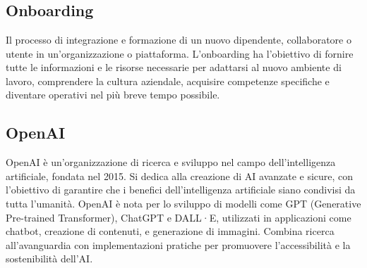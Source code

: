 
\section{}

\hypertarget{sec:onboarding}{}
\subsection*{Onboarding}
Il processo di integrazione e formazione di un nuovo dipendente, collaboratore o utente in un'organizzazione o piattaforma. L'onboarding ha l'obiettivo di 
fornire tutte le informazioni e le risorse necessarie per adattarsi al nuovo ambiente di lavoro, comprendere la cultura aziendale, acquisire competenze 
specifiche e diventare operativi nel più breve tempo possibile. 

\hypertarget{sec:openai}{}
\subsection*{OpenAI}
OpenAI è un'organizzazione di ricerca e sviluppo nel campo dell'intelligenza artificiale, fondata nel 2015. Si dedica alla creazione di AI avanzate e 
sicure, con l'obiettivo di garantire che i benefici dell'intelligenza artificiale siano condivisi da tutta l'umanità. OpenAI è nota per lo sviluppo di 
modelli come GPT (Generative Pre-trained Transformer), ChatGPT e DALL·E, utilizzati in applicazioni come chatbot, creazione di contenuti, e generazione 
di immagini. Combina ricerca all'avanguardia con implementazioni pratiche per promuovere l'accessibilità e la sostenibilità dell'AI.


\newpage